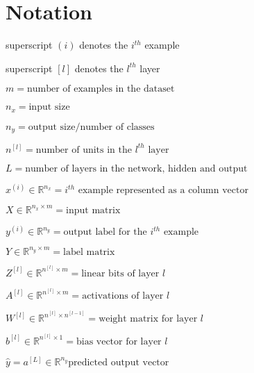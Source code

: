 \section{Notation}

superscript $(i)$ denotes the $i^{th}$ example

superscript $[l]$ denotes the $l^{th}$ layer

$m = \text{number of examples in the dataset}$

$n_x = \text{input size}$

$n_y = \text{output size/number of classes}$

$n^{[l]} = \text{number of units in the } l^{th} \text{ layer}$

$L = \text{number of layers in the network, hidden and output}$

$x^{(i)} \in \mathbb{R}^{n_x} = i^{th} \text{ example represented as a column vector}$

$X \in \mathbb{R}^{n_x \times m} = \text{input matrix}$

$y^{(i)} \in \mathbb{R}^{n_y} = \text{output label for the } i^{th} \text{ example}$

$Y \in \mathbb{R}^{n_y \times m} = \text{label matrix}$

$Z^{[l]} \in \mathbb{R}^{n^{[l]} \times m} = \text{linear bits of layer } l $

$A^{[l]} \in \mathbb{R}^{n^{[l]} \times m} = \text{activations of layer } l $

$W^{[l]} \in \mathbb{R}^{n^{[l]} \times n^{[l-1]}} = \text{weight matrix for layer } l $

$b^{[l]} \in \mathbb{R}^{n^{[l]} \times 1} = \text{bias vector for layer } l $

$\hat{y} = a^{[L]} \in \mathbb{R}^{n_y} \text{predicted output vector}$
